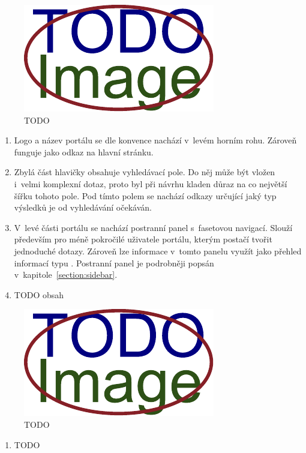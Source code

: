 \begin{figure}[H]
	\centering
	\includegraphics[width=\textwidth]{obrazky-figures/placeholder.pdf}
	\caption{TODO}
	\label{image:portal-results}
\end{figure}
\begin{enumerate}
    \item Logo a název portálu se dle konvence nachází v~levém horním rohu. Zároveň funguje jako odkaz na hlavní stránku.
    \item Zbylá část hlavičky obsahuje vyhledávací pole. Do něj může být vložen i~velmi komplexní dotaz, proto byl při návrhu kladen důraz na co největší šířku tohoto pole. Pod tímto polem se nachází odkazy určující jaký typ výsledků je od vyhledávání očekáván.
    \item V~levé části portálu se nachází postranní panel s~fasetovou navigací. Slouží především pro méně pokročilé uživatele portálu, kterým postačí tvořit jednoduché dotazy. Zároveň lze informace v~tomto panelu využít jako přehled informací typu . Postranní panel je podrobněji popsán v~kapitole~\ref{section:sidebar}.\
    \item TODO obsah
\end{enumerate}


\begin{figure}[H]
	\centering
	\includegraphics[width=\textwidth]{obrazky-figures/placeholder.pdf}
	\caption{TODO}
	\label{image:portal-detail}
\end{figure}
\begin{enumerate}
    \item TODO
\end{enumerate}

